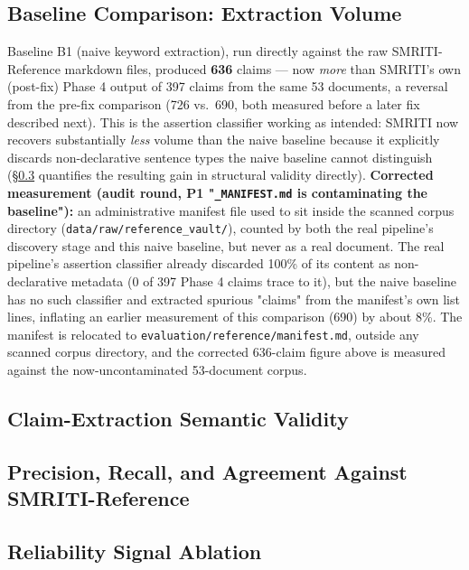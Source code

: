 \subsection{Baseline Comparison: Extraction Volume}

Baseline B1 (naive keyword extraction), run directly against the raw
SMRITI-Reference markdown files, produced \textbf{636} claims --- now
\emph{more} than SMRITI's own (post-fix) Phase 4 output of 397 claims from
the same 53 documents, a reversal from the pre-fix comparison (726 vs.\
690, both measured before a later fix described next). This is the
assertion classifier working as intended: SMRITI now recovers
substantially \emph{less} volume than the naive baseline because it
explicitly discards non-declarative sentence types the naive baseline
cannot distinguish (\S\ref{sec:results-annotation} quantifies the
resulting gain in structural validity directly). \textbf{Corrected
measurement (audit round, P1 "\texttt{\_MANIFEST.md} is
contaminating the baseline"):} an administrative manifest file used to
sit inside the scanned corpus directory (\texttt{data/raw/reference\_vault/}),
counted by both the real pipeline's discovery stage and this naive
baseline, but never as a real document. The real pipeline's assertion
classifier already discarded 100\% of its content as non-declarative
metadata (0 of 397 Phase 4 claims trace to it), but the naive baseline
has no such classifier and extracted spurious "claims" from the
manifest's own list lines, inflating an earlier measurement of this
comparison (690) by about 8\%. The manifest is relocated to
\texttt{evaluation/reference/manifest.md}, outside any scanned corpus
directory, and the corrected 636-claim figure above is measured against
the now-uncontaminated 53-document corpus.

\subsection{Claim-Extraction Semantic Validity}
\label{sec:claim-validity}


\subsection{Precision, Recall, and Agreement Against SMRITI-Reference}
\label{sec:results-annotation}


\subsection{Reliability Signal Ablation}
\label{sec:ablation}


